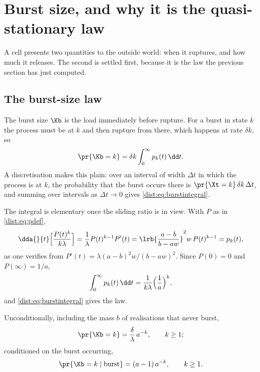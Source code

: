 \section{Burst size, and why it is the quasi-stationary law}
\label{dist:sec:burst-size}

A cell presents two quantities to the outside world: when it ruptures, and how
much it releases. The second is settled first, because it is the law the
previous section has just computed.

\subsection{The burst-size law}
\label{dist:sec:burst-law}

The burst size $\Kb$ is the load immediately before rupture. For a burst in
state $k$ the process must be at $k$ and then rupture from there, which
happens at rate $\delta k$, so
\begin{equation}
\pr{\Kb = k} = \delta k \int_0^\infty p_k(t)\,\dd t.
\label{dist:eq:burstintegral}
\end{equation}
A discretisation makes this plain: over an interval of width $\Delta t$ in
which the process is at $k$, the probability that the burst occurs there is
$\pr{\Xt=k}\,\delta k\,\Delta t$, and summing over intervals as
$\Delta t\to0$ gives \cref{dist:eq:burstintegral}.

The integral is elementary once the sliding ratio is in view. With $P$ as in
\cref{dist:eq:pdef},
\begin{equation}
\dda{}{t}\Bigl[\frac{P(t)^k}{k\lambda}\Bigr]
=\frac{1}{\lambda}P(t)^{k-1}P'(t)
=\lrb{\frac{a-b}{b-aw}}^2 w\,P(t)^{k-1}
=p_k(t),
\label{dist:eq:antideriv}
\end{equation}
as one verifies from $P'(t)=\lambda(a-b)^2w/(b-aw)^2$. Since $P(0)=0$ and
$P(\infty)=1/a$,
\begin{equation}
\int_0^\infty p_k(t)\,\dd t=\frac{1}{k\lambda}\Bigl(\frac{1}{a}\Bigr)^{k},
\label{dist:eq:pkintegral}
\end{equation}
and \cref{dist:eq:burstintegral} gives the law.

\begin{theorem}
\label{dist:thm:burst}
Unconditionally, including the mass $b$ of realisations that never burst,
\begin{equation}
\pr{\Kb=k}=\frac{\delta}{\lambda}\,a^{-k},\qquad k\ge1;
\label{dist:eq:burstlaw}
\end{equation}
conditioned on the burst occurring,
\begin{equation}
\pr{\Kb=k\mid\text{burst}}=(a-1)\,a^{-k},\qquad k\ge1.
\label{dist:eq:burstlawcond}
\end{equation}
\end{theorem}

